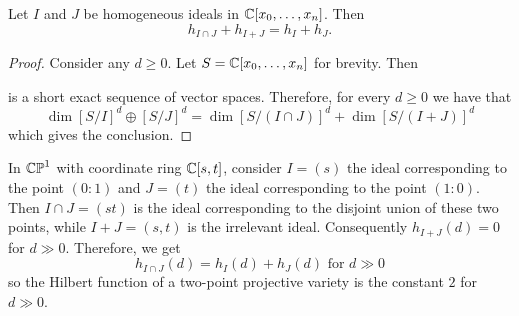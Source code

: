 \begin{proposition}
	Let $I$ and $J$ be homogeneous ideals in $\mathbb C[x_0, \dots, x_n]$.
	Then \[ h_{I \cap J} + h_{I+J} = h_I + h_J. \]
\end{proposition}
\begin{proof}
	Consider any $d \ge 0$.
	Let $S = \mathbb C[x_0, \dots, x_n]$ for brevity.
	Then
	\begin{center}
	\end{center}
	is a short exact sequence of vector spaces.
	Therefore, for every $d \ge 0$ we have that
	\[
		\dim \left[ S / I \right]^d \oplus \left[ S / J \right]^d
		= \dim \left[ S / (I \cap J) \right]^d
		+ \dim \left[ S / (I+J) \right]^d
	\]
	which gives the conclusion.
\end{proof}
\begin{example}
	In $\mathbb{CP}^1$ with coordinate ring $\mathbb C[s,t]$,
	consider $I = (s)$ the ideal corresponding to the point $(0:1)$
	and $J = (t)$ the ideal corresponding to the point $(1:0)$.
	Then $I \cap J = (st)$ is the ideal corresponding
	to the disjoint union of these two points,
	while $I+J = (s,t)$ is the irrelevant ideal.
	Consequently $h_{I+J}(d) = 0$ for $d \gg 0$.
	Therefore, we get
	\[ h_{I \cap J}(d) = h_I(d) + h_J(d) \text{ for $d \gg 0$} \]
	so the Hilbert function of a two-point projective variety
	is the constant $2$ for $d \gg 0$.
\end{example}

